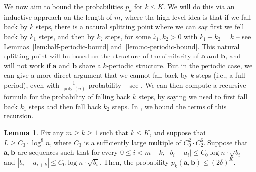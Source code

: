 \documentclass[12pt]{article}
\theoremstyle{definition}
\newtheorem{lemma}[theorem]{Lemma}
\theoremstyle{remark}
\DeclareMathOperator*{\poly}{poly}
\newcommand{\ba}{\mathbf a}
\newcommand{\bb}{\mathbf b}
\begin{document}
We now aim to bound the probabilities $p_k$ for $k \le K$. We will do this via an inductive approach on the length of $m$, where the high-level idea is that if we fall back by $k$ steps, there is a natural splitting point where we can say first we fell back by $k_1$ steps, and then by $k_2$ steps, for some $k_1, k_2 > 0$ with $k_1+k_2 = k$ -- see Lemmas~\ref{lem:half-periodic-bound} and~\ref{lem:no-periodic-bound}. This natural splitting point will be based on the structure of the similarity of $\ba$ and $\bb$, and will not work if $\ba$ and $\bb$ share a $k$-periodic structure. But in the periodic case, we can give a more direct argument that we cannot fall back by $k$ steps (i.e., a full period), even with $\frac{1}{\poly(n)}$ probability -- see . We can then compute a recursive formula for the probability of falling back $k$ steps, by saying we need to first fall back $k_1$ steps and then fall back $k_2$ steps. In , we bound the terms of this recursion.

\begin{lemma} \label{lem:periodic-bound}
    Fix any $m \ge k \ge 1$ such that $k \le K$, and suppose that $L \ge C_3 \cdot \log^8 n$, where $C_3$ is a sufficiently large multiple of $C_0^2 \cdot C_2^6$. Suppose that $\ba, \bb$ are sequences such that for every $0 \le i < m-k,$ $|b_i-a_i| \le C_0 \log n \cdot \sqrt{b_i}$ and $|b_i-a_{i+k}| \le C_0 \log n \cdot \sqrt{b_i}$. Then, the probability $p_k(\ba, \bb) \le (2\delta)^{K}$.
\end{lemma}
\end{document}
